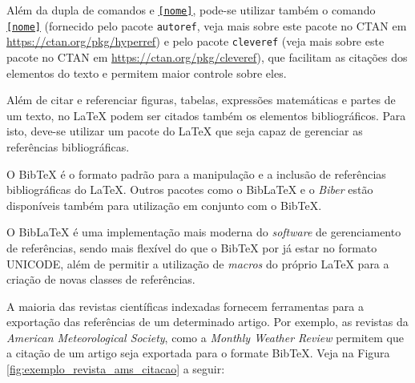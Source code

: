 \begin{marker}
Além da dupla de comandos \texttt{\label{nome}} e \texttt{\ref{nome}}, pode-se utilizar também o comando \texttt{\autoref{nome}} (fornecido pelo pacote {\tt autoref}, veja mais sobre este pacote no CTAN em \url{https://ctan.org/pkg/hyperref}) e pelo pacote {\tt cleveref} (veja mais sobre este pacote no CTAN em \url{https://ctan.org/pkg/cleveref}), que facilitam as citações dos elementos do texto e permitem maior controle sobre eles.
\end{marker}

Além de citar e referenciar figuras, tabelas, expressões matemáticas e partes de um texto, no \LaTeX{} podem ser citados também os elementos bibliográficos. Para isto, deve-se utilizar um pacote do \LaTeX{} que seja capaz de gerenciar as referências bibliográficas.

O Bib\TeX{} é o formato padrão para a manipulação e a inclusão de referências bibliográficas do \LaTeX{}. Outros pacotes como o Bib\LaTeX{} e o \textit{Biber} estão disponíveis também para utilização em conjunto com o Bib\TeX{}.

O Bib\LaTeX{} é uma implementação mais moderna do \textit{software} de gerenciamento de referências, sendo mais flexível do que o Bib\TeX{} por já estar no formato UNICODE, além de permitir a utilização de \textit{macros} do próprio \LaTeX{} para a criação de novas classes de referências.

A maioria das revistas científicas indexadas fornecem ferramentas para a exportação das referências de um determinado artigo. Por exemplo, as revistas da \textit{American Meteorological Society}, como a \textit{Monthly Weather Review} permitem que a citação de um artigo seja exportada para o formate Bib\TeX{}. Veja na Figura \ref{fig:exemplo_revista_ams_citacao} a seguir:

